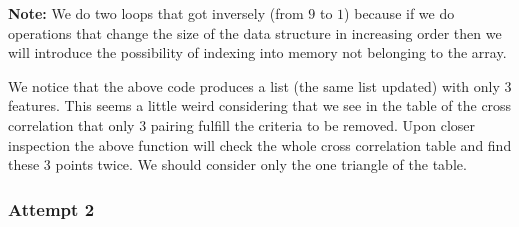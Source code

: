 \documentclass[12pt, a4paper]{article}
\begin{document}
\textbf{Note: }We do two loops that got inversely (from $9$ to $1$) because if we do operations that change the size of the data structure in increasing order then we will introduce the possibility of indexing into memory not belonging to the array.
\newline

We notice that the above code produces a list (the same list updated) with only 3 features. This seems a little weird considering that we see in the table of the cross correlation that only 3 pairing fulfill the criteria to be removed. Upon closer inspection the above function will check the whole cross correlation table and find these 3 points twice. We should consider only the one triangle of the table.

\subsubsection{Attempt 2}
\end{document}
